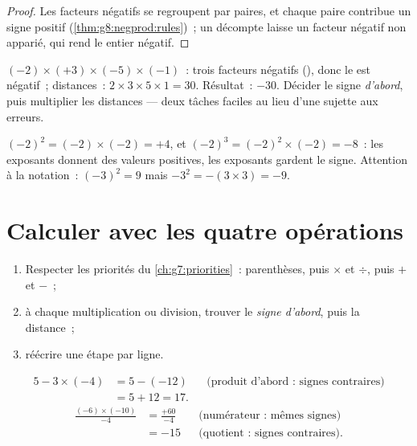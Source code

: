 \begin{proof}
Les facteurs négatifs se regroupent par paires, et chaque paire
contribue un signe positif (\cref{thm:g8:negprod:rules})~; un décompte
 laisse un facteur négatif non apparié, qui rend le 
entier négatif.
\end{proof}

\begin{example}\label{ex:g8:negprod:many}
$(-2) \times (+3) \times (-5) \times (-1)$~: trois facteurs négatifs
(), donc le  est négatif~; distances~:
$2 \times 3 \times 5 \times 1 = 30$. Résultat~: $-30$. Décider le
signe \emph{d'abord}, puis multiplier les distances --- deux tâches
faciles au lieu d'une sujette aux erreurs.
\end{example}

\begin{example}\label{ex:g8:negprod:powers}
$(-2)^2 = (-2) \times (-2) = +4$, et
$(-2)^3 = (-2)^2 \times (-2) = -8$~: les exposants  donnent des
valeurs positives, les exposants  gardent le signe. Attention
à la notation~: $(-3)^2 = 9$ mais $-3^2 = -(3 \times 3) = -9$.
\end{example}

\section{Calculer avec les quatre opérations}

\begin{method}\label{met:g8:negprod:compute}
\begin{enumerate}
  \item Respecter les priorités du \cref{ch:g7:priorities}~:
        parenthèses, puis $\times$ et $\div$, puis $+$ et $-$~;
  \item à chaque multiplication ou division, trouver le \emph{signe
        d'abord}, puis la distance~;
  \item réécrire une étape par ligne.
\end{enumerate}
\end{method}

\begin{example}\label{ex:g8:negprod:compute}
\begin{align*}
5 - 3 \times (-4)
&= 5 - (-12) && \text{(produit d'abord~: signes contraires)}\\
&= 5 + 12 = 17 .
\end{align*}
\begin{align*}
\frac{(-6) \times (-10)}{-4}
&= \frac{+60}{-4} && \text{(numérateur~: mêmes signes)}\\
&= -15 && \text{(quotient~: signes contraires).}
\end{align*}
\end{example}

